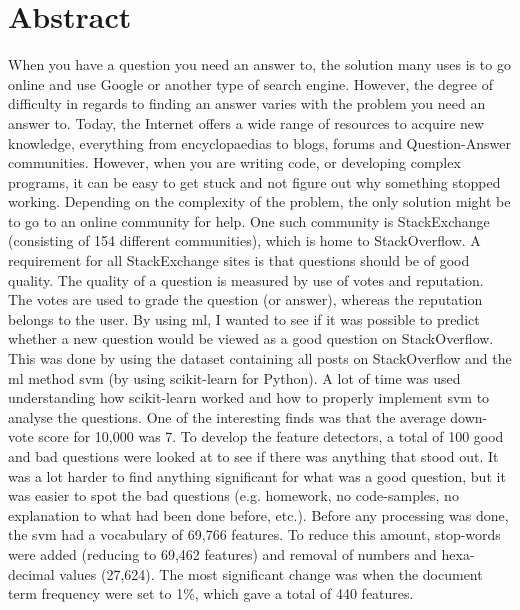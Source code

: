 \chapter*{Abstract}



When you have a question you need an answer to, the solution many uses is to go online and use Google or another 
type of search engine. However, the degree of difficulty in regards to finding an answer varies with the problem 
you need an answer to. Today, the Internet offers a wide range of resources to acquire new knowledge, everything 
 from encyclopaedias to blogs, forums and Question-Answer communities. However, when you are writing code, or 
  developing complex programs, it can be easy to get stuck and not figure out why something stopped working. 
\vspace{0.5em}\newline
Depending on the complexity of the problem, the only solution might be to go to an online community for help. 
One such community is StackExchange (consisting of 154 different communities), which is home to StackOverflow. 
A requirement for all StackExchange sites is that questions should be of good quality. The quality of a question 
is measured by use of votes and reputation. The votes are used to grade the question (or answer), whereas the 
reputation belongs to the user. 
\vspace{0.5em}\newline
By using \gls{ml}, I wanted to see if it was possible to predict whether a new question would be viewed as a good
 question on StackOverflow. This was done by using the dataset containing all posts on StackOverflow and the 
 \gls{ml} method \gls{svm} (by using scikit-learn for Python). A lot of time was used understanding how 
 scikit-learn worked and how to properly implement \gls{svm} to analyse the questions. 
\vspace{0.5em}\newline
One of the interesting finds was that the average down-vote score for 10,000 was 7. To develop the feature 
detectors, a total of 100 good and bad questions were looked at to see if there was anything that stood out. 
It was a lot harder to find anything significant for what was a good question, but it was easier to spot the bad 
 questions (e.g. homework, no code-samples, no explanation to what had been done before, etc.).
\vspace{0.5em}\newline
Before any processing was done, the \gls{svm} had a vocabulary of 69,766 features. To reduce this amount, 
stop-words were added (reducing to 69,462 features) and removal of numbers and hexa-decimal values (27,624). 
The most significant change was when the document term frequency were set to 1\%, which gave a total of 440 
features.


